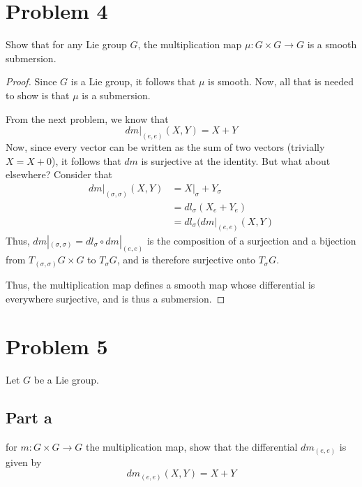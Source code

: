 \documentclass[fontsize=11pt]{scrartcl} %
\numberwithin{equation}{section} %
\numberwithin{figure}{section} %
\numberwithin{table}{section} %
\begin{document}
\newpage

\section*{Problem 4}
Show that for any Lie group $G$, the multiplication map $\mu:G\times G\to G$ is
a smooth submersion.
\\
\begin{proof}
Since $G$ is a Lie group, it follows that $\mu$ is smooth. Now, all that is
    needed to show is that $\mu$ is a submersion.

    From the next problem, we know that
    \[
        dm|_{(e,e)}(X,Y) = X+Y
    \]
    Now, since every vector can be written as the sum of two vectors (trivially
    $X=X+0$), it follows that $dm$ is surjective at the identity. But what about
    elsewhere? Consider that
    \[
        \begin{aligned}
            dm|_{(\sigma,\sigma)}(X,Y) &= X|_{\sigma} + Y_{\sigma}\\
                                &= dl_{\sigma}(X_e + Y_e)\\
                                &=dl_{\sigma}(dm|_{(e,e)}(X,Y)
        \end{aligned}
    \]
    Thus, $dm|_{(\sigma,\sigma)} = dl_{\sigma}\circ dm|_{(e,e)}$ is the
    composition of a surjection and a bijection from
    $T_{(\sigma,\sigma)}G\times G$ to $T_{\sigma}G$, and is therefore surjective
    onto $T_{\sigma}G$.

    Thus, the multiplication map defines a smooth map whose differential is
    everywhere surjective, and is thus a submersion.
\end{proof}

\newpage

\section*{Problem 5}
Let $G$ be a Lie group.
\subsection*{Part a}
for $m:G\times G\to G$ the multiplication map, show that the differential
$dm_{(e,e)}$ is given by
\[
    dm_{(e,e)}(X,Y) = X+Y
\]
\end{document}
